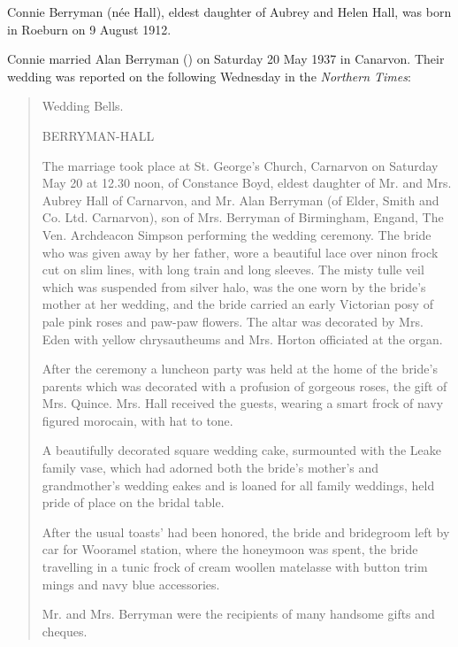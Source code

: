 
Connie Berryman (n\'{e}e Hall), eldest daughter of Aubrey and Helen Hall, was born in Roeburn on 9 August 1912.\cite{ConnieBirthNotice}

Connie married Alan Berryman () on Saturday 20 May 1937 in Canarvon. Their wedding was reported on the following Wednesday in the \emph{Northern Times}:\cite{ConnieWedding}

\begin{quotation}
Wedding Bells.

BERRYMAN-HALL

The marriage took place at St. George's Church, Carnarvon on Saturday May 20 at 12.30 noon, of Constance Boyd, eldest daughter of Mr. and Mrs. Aubrey Hall of Carnarvon, and Mr. Alan Berryman (of Elder, Smith and Co. Ltd. Carnarvon), son of Mrs. Berryman of Birmingham, Engand, The Ven. Archdeacon Simpson performing the wedding ceremony. The bride who was given away by her father, wore a beautiful lace over ninon frock cut on slim lines, with long train and long sleeves. The misty tulle veil which was suspended from silver halo, was the one worn by the bride's mother at her wedding, and the bride carried an early Victorian posy of pale pink roses and paw-paw flowers. The altar was decorated by Mrs. Eden with yellow chrysautheums and Mrs. Horton officiated at the organ.

After the ceremony a luncheon party was held at the home of the bride's parents which was decorated with a     profusion of gorgeous roses, the gift of Mrs. Quince. Mrs. Hall received the guests, wearing a smart frock of navy figured morocain, with hat to tone.

A beautifully decorated square wedding cake, surmounted with the Leake family vase, which had adorned both the bride's mother's and grandmother's wedding eakes and is loaned for all family weddings, held pride of place on the bridal table.

After the usual toasts' had been honored, the bride and bridegroom left by car for Wooramel station, where the honeymoon was spent, the bride travelling in a tunic frock of cream woollen matelasse with button trim mings and navy blue accessories.

Mr. and Mrs. Berryman were the recipients of many handsome gifts and cheques.
\end{quotation}
